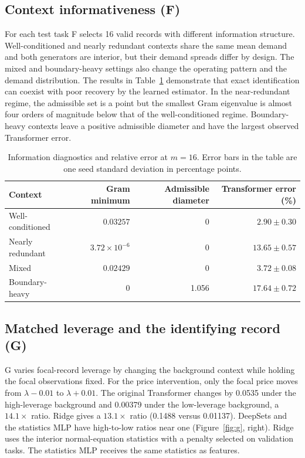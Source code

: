 \documentclass[11pt,letterpaper]{article}
\begin{document}
\subsection{Context informativeness (F)}
For each test task F selects 16 valid records with different
information structure. Well-conditioned and nearly redundant
contexts share the same mean demand and both generators are interior,
but their demand spreads differ by design. The mixed and boundary-heavy
settings also change the operating pattern and the demand distribution.
The results in Table~\ref{tab:f} demonstrate that exact identification
can coexist with poor recovery by the learned estimator. In the
near-redundant regime, the admissible set is a point but the smallest
Gram eigenvalue is almost four orders of magnitude below that of the
well-conditioned regime. Boundary-heavy contexts leave a positive
admissible diameter and have the largest observed Transformer error.

\begin{table}[ht]
\centering
\small
\begin{tabular}{l rrr}
\toprule
Context&Gram minimum&Admissible diameter&Transformer error (\%)\\
\midrule
Well-conditioned&\(0.03257\)&0&\(2.90\pm0.30\)\\
Nearly redundant&\(3.72\times10^{-6}\)&0&\(13.65\pm0.57\)\\
Mixed&\(0.02429\)&0&\(3.72\pm0.08\)\\
Boundary-heavy&0&1.056&\(17.64\pm0.72\)\\
\bottomrule
\end{tabular}
\caption{Information diagnostics and relative error at \(m=16\).
Error bars in the table are one seed standard deviation in percentage points.}
\label{tab:f}
\end{table}

\clearpage
\subsection{Matched leverage and the identifying record (G)}
G varies focal-record leverage by changing the background context
while holding the focal observations fixed. For the price intervention,
only the focal price moves from \(\lambda-0.01\) to \(\lambda+0.01\).
The original Transformer changes by 0.0535 under the high-leverage
background and 0.00379 under the low-leverage background, a
\(14.1\times\) ratio. Ridge gives a \(13.1\times\) ratio
(0.1488 versus 0.01137). DeepSets and the statistics MLP have
high-to-low ratios near one (Figure~\ref{fig:g}, right). Ridge uses the interior normal-equation
statistics with a penalty selected on validation tasks. The statistics
MLP receives the same statistics as features.
\end{document}

